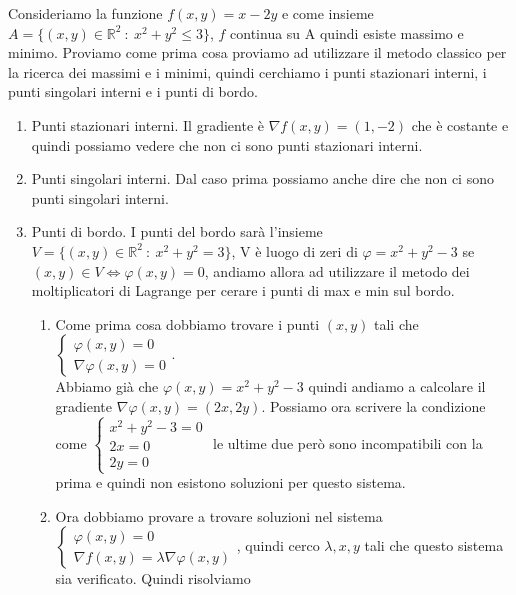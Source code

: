 \begin{example}
Consideriamo la funzione $f(x,y) = x - 2y$ e come insieme $A = \{(x,y) \in \mathbb{R}^2 \::\: x^2 + y^2 \leq 3\}$, $f$ continua su A quindi esiste massimo e minimo. Proviamo come prima cosa proviamo ad utilizzare il metodo classico per la ricerca dei massimi e i minimi, quindi cerchiamo i punti stazionari interni, i punti singolari interni e i punti di bordo.
\begin{enumerate}
    \item Punti stazionari interni. Il gradiente è $\nabla f(x,y) = (1,-2)$ che è costante e quindi possiamo vedere che non ci sono punti stazionari interni.
    \item Punti singolari interni. Dal caso prima possiamo anche dire che non ci sono punti singolari interni.
    \item Punti di bordo. I punti del bordo sarà l'insieme $V = \{(x,y) \in \mathbb{R}^2 \::\: x^2 + y^2 = 3\}$, V è luogo di zeri di $\varphi = x^2 + y^2 - 3$ se $(x,y) \in V \Longleftrightarrow \varphi(x,y) = 0$, andiamo allora ad utilizzare il metodo dei moltiplicatori di Lagrange per cerare i punti di max e min sul bordo.\\
    \begin{enumerate}
        \item Come prima cosa dobbiamo trovare i punti $(x,y)$ tali che $\begin{cases}\varphi(x,y) = 0\\ \nabla \varphi(x,y) = 0\end{cases}$.\\
        Abbiamo già che $\varphi(x,y) = x^2 + y^2 -3$ quindi andiamo a calcolare il gradiente $\nabla \varphi(x,y) = (2x, 2y)$. Possiamo ora scrivere la condizione come $\begin{cases}x^2 + y^2 -3 = 0\\ 2x=0 \\ 2y = 0\end{cases}$ le ultime due però sono incompatibili con la prima e quindi non esistono soluzioni per questo sistema.
        \item Ora dobbiamo provare a trovare soluzioni nel sistema $\begin{cases}\varphi(x,y) = 0 \\ \nabla f(x,y) = \lambda \nabla \varphi(x,y)\end{cases}$, quindi cerco $\lambda,x,y$ tali che questo sistema sia verificato. Quindi risolviamo\\\\

\end{enumerate}
\end{enumerate}
\end{example}
